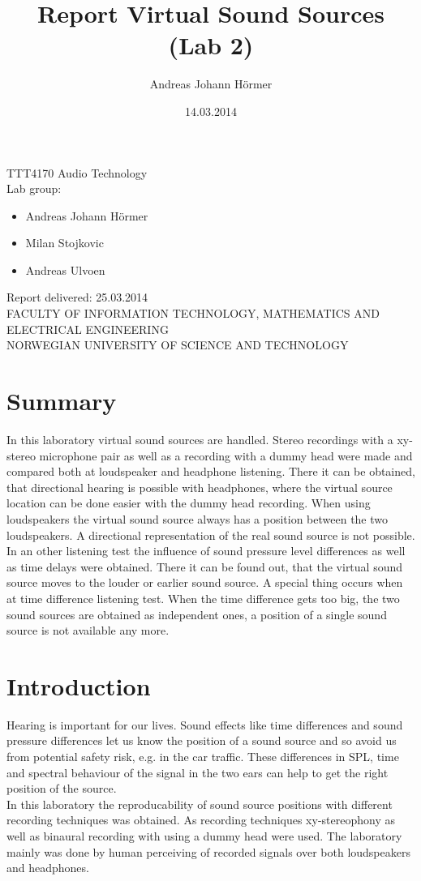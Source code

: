 \documentclass{article}
\title{Report Virtual Sound Sources (Lab 2)}
\author{Andreas Johann H\"ormer}
\date{14.03.2014}
\begin{document}
\thispagestyle{empty}
\maketitle
\thispagestyle{empty}
\begin{center}
TTT4170 Audio Technology\\[3cm]
Lab group:
\begin{itemize}
\item Andreas Johann H\"ormer
\item Milan Stojkovic
\item Andreas Ulvoen\\[3cm]
\end{itemize}
Report delivered: 25.03.2014\\[6cm]
FACULTY OF INFORMATION TECHNOLOGY, MATHEMATICS AND ELECTRICAL ENGINEERING\\
NORWEGIAN UNIVERSITY OF SCIENCE AND TECHNOLOGY
\end{center}
\thispagestyle{empty}
\tableofcontents
\thispagestyle{empty}
\newpage
\section*{Summary}
\thispagestyle{empty}
In this laboratory virtual sound sources are handled. Stereo recordings with a xy-stereo microphone pair as well as a recording with a dummy head were made and compared both at loudspeaker and headphone listening. There it can be obtained, that directional hearing is possible with headphones, where the virtual source location can be done easier with the dummy head recording. When using loudspeakers the virtual sound source always has a position between the two loudspeakers. A directional representation of the real sound source is not possible.\\
In an other listening test the influence of sound pressure level differences as well as time delays were obtained. There it can be found out, that the virtual sound source moves to the louder or earlier sound source. A special thing occurs when at time difference listening test. When the time difference gets too big, the two sound sources are obtained as independent ones, a position of a single sound source is not available any more.

\newpage
\setcounter{page}{1}
\section{Introduction}
Hearing is important for our lives. Sound effects like time differences and sound pressure differences let us know the position of a sound source and so avoid us from potential safety risk, e.g. in the car traffic. These differences in SPL, time and spectral behaviour of the signal in the two ears can help to get the right position of the source.\\
In this laboratory the reproducability of sound source positions with different recording techniques was obtained. As recording techniques xy-stereophony as well as binaural recording with using a dummy head were used. The laboratory mainly was done by human perceiving of recorded signals over both loudspeakers and headphones.
\end{document}
